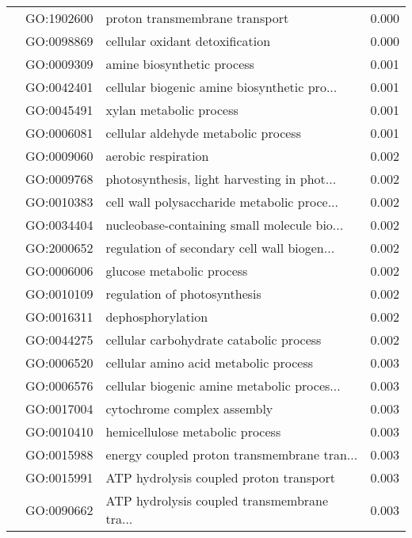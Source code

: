 \begin{longtable}{lllr}
   & GO:1902600 &               proton transmembrane transport &         0.000 \\
   & GO:0098869 &              cellular oxidant detoxification &         0.000 \\
   & GO:0009309 &                   amine biosynthetic process &         0.001 \\
   & GO:0042401 &  cellular biogenic amine biosynthetic pro... &         0.001 \\
   & GO:0045491 &                      xylan metabolic process &         0.001 \\
   & GO:0006081 &          cellular aldehyde metabolic process &         0.001 \\
   & GO:0009060 &                          aerobic respiration &         0.002 \\
   & GO:0009768 &  photosynthesis, light harvesting in phot... &         0.002 \\
   & GO:0010383 &  cell wall polysaccharide metabolic proce... &         0.002 \\
   & GO:0034404 &  nucleobase-containing small molecule bio... &         0.002 \\
   & GO:2000652 &  regulation of secondary cell wall biogen... &         0.002 \\
   & GO:0006006 &                    glucose metabolic process &         0.002 \\
   & GO:0010109 &                 regulation of photosynthesis &         0.002 \\
   & GO:0016311 &                            dephosphorylation &         0.002 \\
   & GO:0044275 &      cellular carbohydrate catabolic process &         0.002 \\
   & GO:0006520 &        cellular amino acid metabolic process &         0.003 \\
   & GO:0006576 &  cellular biogenic amine metabolic proces... &         0.003 \\
   & GO:0017004 &                  cytochrome complex assembly &         0.003 \\
   & GO:0010410 &              hemicellulose metabolic process &         0.003 \\
   & GO:0015988 &  energy coupled proton transmembrane tran... &         0.003 \\
   & GO:0015991 &      ATP hydrolysis coupled proton transport &         0.003 \\
   & GO:0090662 &  ATP hydrolysis coupled transmembrane tra... &         0.003 \\

\end{longtable}
